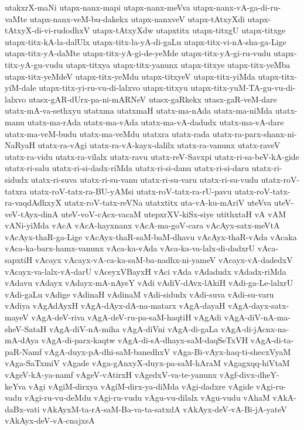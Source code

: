 {utakxrX-maNi
utapx-nanx-mapi
utapx-nanx-meVva
utapx-nanx-vA-ga-di-ru-vaMte
utapx-nanx-veM-bu-dakekx
utapx-nanxveV
utapx-tAtxyXdi
utapx-tAtxyX-di-vi-rudodhxV
utapx-tAtxyXdw
utapxtitx
utapx-titxgU
utapx-titxge
utapx-titx-kA-la-dalUlx
utapx-titx-la-yA-di-gaLu
utapx-titx-vi-nA-sha-ga-Lige
utapx-titx-yA-daMte
utapx-titx-yA-gi-de-yeMde
utapx-titx-yA-gi-ru-vudu
utapx-titx-yA-gu-vudu
utapx-titxya
utapx-titx-yanunx
utapx-titxye
utapx-titx-yeMba
utapx-titx-yeMdeV
utapx-titx-yeMdu
utapx-titxyeV
utapx-titx-yiMda
utapx-titx-yiM-dale
utapx-titx-yi-ru-vu-di-lalxvo
utapx-titxyu
utapx-titx-yuM-TA-gu-vu-di-lalxvo
utasx-gAR-dUrx-pa-ni-mARNeV
utasx-gaRkekx
utasx-gaR-veM-dare
utatx-mA-va-sethxyu
utatxma
utatxmaH
utatx-ma-nAda
utatx-ma-niMda
utatx-manu
utatx-ma-rAda
utatx-ma-vAda
utatx-ma-vA-dadudx
utatx-ma-vA-dare
utatx-ma-veM-budu
utatx-ma-veMdu
utatxra
utatx-rada
utatx-ra-parx-shanx-ni-NaRyaH
utatx-ra-vAgi
utatx-ra-vA-kayx-dalilx
utatx-ra-vanunx
utatx-raveV
utatx-ra-vidu
utatx-ra-vilalx
utatx-ravu
utatx-reV-Savxpi
utatx-ri-sa-beV-kA-gide
utatx-ri-salu
utatx-ri-si-dadx-riMda
utatx-ri-si-danu
utatx-ri-si-daru
utatx-ri-sidudx
utatx-ri-suva
utatx-ri-su-vanu
utatx-ri-su-varu
utatx-ri-su-vudu
utatx-roV-tatxra
utatx-roV-tatx-ra-BU-yAMsi
utatx-roV-tatx-ra-rU-pavu
utatx-roV-tatx-ra-vaqdAdhxyX
utatx-roV-tatx-reVNa
utatxtitx
uta-vA-ku-mAriV
uteVva
uteV-veV-tAyx-dinA
uteV-voV-cAcx-vacaM
utepxrXV-kiSx-siye
utithxtaH
vA
vAM
vANi-yiMda
vAcA
vAcA-hayxnanx
vAcA-ma-goV-cara
vAcAyx-satx-meVtA
vAcAyx-thaR-ga-Lige
vAcAyx-thaR-saM-baM-dhavu
vAcAyx-thaR-vAda
vAcaka
vAca-ka-barx-hamx-vanunx
vAca-ka-vAda
vAca-ka-va-lalx-di-dadxrU
vAca-sapxtiH
vAcayx
vAcayx-vA-ca-ka-saM-ba-nadhx-ni-yameV
vAcayx-vA-dadedxV
vAcayx-va-lalx-vA-darU
vAceyxVBayxH
vAci
vAda
vAdadudx
vAdadx-riMda
vAdavu
vAdayx
vAdayx-mA-nAyeY
vAdi
vAdiV-dAvx-lAkiH
vAdi-ga-Le-lalxrU
vAdi-gaLu
vAdige
vAdinaH
vAdinaM
vAdi-sidudx
vAdi-suva
vAdi-su-varu
vAdiya
vAgAdAyxH
vAgA-dAyx-dA-na-matarx
vAgA-dayaH
vAgA-dayx-satx-mayeV
vAgA-deV-riva
vAgA-deV-ru-pa-saM-haqtiH
vAgAdi
vAgA-diV-nA-ma-sheV-SataH
vAgA-diV-nA-miha
vAgA-diVni
vAgA-di-gaLa
vAgA-di-jAcnx-na-mA-dAya
vAgA-di-parx-kaqtw
vAgA-di-sA-dhayx-saM-daqSeTxVH
vAgA-di-ta-paR-Namf
vAgA-duyx-pA-dhi-saM-banedhxV
vAga-Bi-vAyx-haq-ti-shecxVyaM
vAga-SaTxmiV
vAgade
vAga-gAnxyX-duyx-pa-saM-hAraM
vAgagxqq-hiVtaM
vAgeV-kA-ya-namf
vAgeV-vAtirxH
vAgedxV-va-te-yanunx
vAgf-divx-dheY-keYva
vAgi
vAgiM-dirxya
vAgiM-dirx-ya-diMda
vAgi-dadxre
vAgide
vAgi-ru-vadu
vAgi-ru-vu-deMdu
vAgi-ru-vudu
vAgu-vu-dilalx
vAgu-vudu
vAhaM
vAkA-daBx-vati
vAkAyxM-ta-rA-saM-Ba-va-ta-satxdA
vAkAyx-deV-vA-Bi-jA-yateV
vAkAyx-deV-vA-cnajxsA
}
